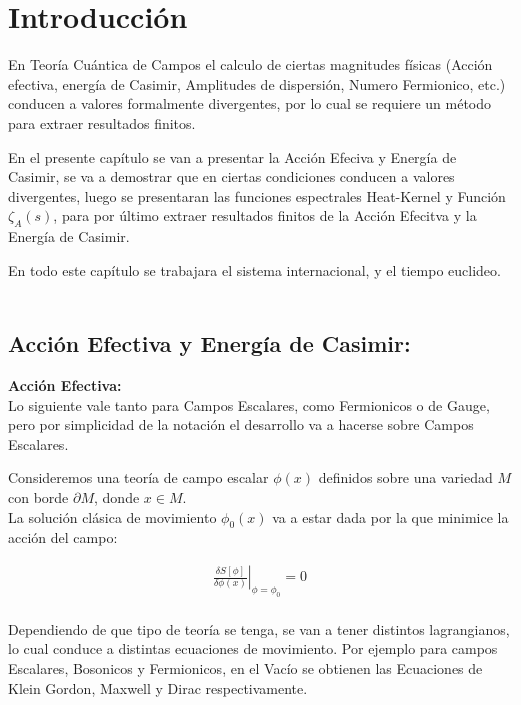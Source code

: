 \chapter{Introducción}



En Teoría Cuántica de Campos el calculo de ciertas magnitudes físicas (Acción efectiva, energía de Casimir, Amplitudes de dispersión, Numero Fermionico, etc.) conducen a valores formalmente divergentes, por lo cual se requiere un método para extraer resultados finitos. 

En el presente capítulo se van a presentar la Acción Efeciva y Energía de Casimir, se va a demostrar que en ciertas condiciones conducen a valores divergentes, luego se presentaran las funciones espectrales Heat-Kernel y Función $ \zeta _A (s) $, para por último extraer resultados finitos de la Acción Efecitva y la Energía de Casimir.


En todo este capítulo se trabajara el sistema internacional, y el tiempo euclideo. \\ \\


\section{Acción Efectiva y Energía de Casimir: }
\textbf{Acción Efectiva:}\\

Lo siguiente vale tanto para Campos Escalares, como Fermionicos o de Gauge, pero por simplicidad de la notación el desarrollo va a hacerse sobre Campos Escalares.

Consideremos una teoría de campo escalar $\phi(x)$ definidos sobre una variedad $M$ con borde $\partial M$, donde $x \in  M$. \\

La solución clásica de movimiento $ \phi _0 (x) $ va a estar dada por la que minimice la acción del campo:

\begin{equation}
\begin{array}{c}
\left. \frac{\delta S [ \phi ] }{\delta \phi (x)}  \right| _{\phi = \phi _0  } = 0 \\[10pt]
\end{array}
\end{equation}


Dependiendo de que tipo de teoría se tenga, se van a tener distintos lagrangianos, lo cual conduce a distintas ecuaciones de movimiento. Por ejemplo para campos Escalares, Bosonicos y Fermionicos, en el Vacío se obtienen las Ecuaciones de Klein Gordon, Maxwell y Dirac respectivamente.

